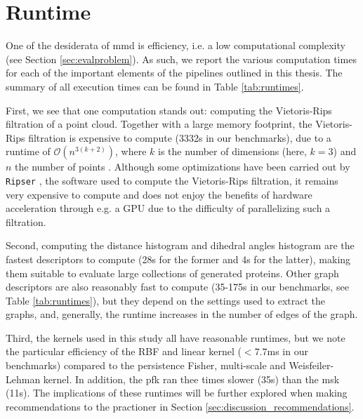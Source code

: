 \clearpage
\section{Runtime}\label{sec:results_runtime}

One of the desiderata of \gls{mmd} is efficiency, i.e. a low computational
complexity (see Section \ref{sec:evalproblem}). As such, we report the various
computation times for each of the important elements of the pipelines outlined
in this thesis. The summary of all execution times can be found in Table
\ref{tab:runtimes}.

First, we see that one computation stands out: computing the Vietoris-Rips
filtration of a point cloud. Together with a large memory footprint, the
Vietoris-Rips filtration is expensive to compute (3332s in our benchmarks), due
to a runtime of $\mathcal{O}(n^{3(k+2)})$, where $k$ is the number of dimensions
(here, $k=3$) and $n$ the number of points \citep{adams2018persistent}. Although
some optimizations have been carried out by \texttt{Ripser}
\cite{Bauer2021Ripser}, the software used to compute the Vietoris-Rips
filtration, it remains very expensive to compute and does not enjoy the benefits
of hardware acceleration through e.g. a GPU due to the difficulty of
parallelizing such a filtration.

Second, computing the distance histogram and dihedral angles histogram are the
fastest descriptors to compute (28s for the former and 4s for the latter),
making them suitable to evaluate large collections of generated proteins. Other
graph descriptors are also reasonably fast to compute (35-175s in our
benchmarks, see Table \ref{tab:runtimes}), but they depend on the settings used
to extract the graphs, and, generally, the runtime increases in the number of
edges of the graph.

Third, the kernels used in this study all have reasonable runtimes, but we note
the particular efficiency of the RBF and linear kernel ($<7.7$ms in our
benchmarks) compared to the persistence Fisher, multi-scale and
Weisfeiler-Lehman kernel. In addition, the \gls{pfk} ran thee
times slower (35s) than the \gls{msk} (11s). The implications of these
runtimes will be further explored when making recommendations to the practioner
in Section \ref{sec:discussion_recommendations}.


